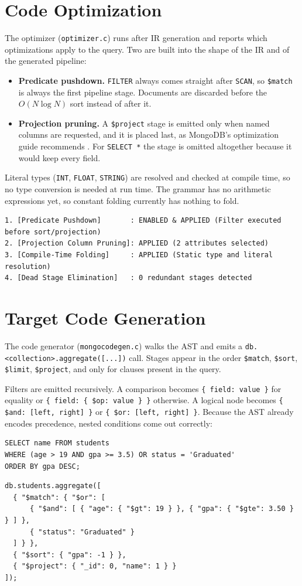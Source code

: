 \documentclass[12pt,a4paper]{report}
\newcommand{\codeus}{\textunderscore\allowbreak}
\DeclareRobustCommand{\code}[1]{\texttt{\let\_\codeus #1}}
\begin{document}
\section{Code Optimization}
The optimizer (\code{optimizer.c}) runs after IR generation and reports which optimizations apply to the query. Two are built into the shape of the IR and of the generated pipeline:
\begin{itemize}
  \item \textbf{Predicate pushdown.} \code{FILTER} always comes straight after \code{SCAN}, so \code{\$match} is always the first pipeline stage. Documents are discarded before the $O(N \log N)$ sort instead of after it.
  \item \textbf{Projection pruning.} A \code{\$project} stage is emitted only when named columns are requested, and it is placed last, as MongoDB's optimization guide recommends \cite{mongo-opt}. For \code{SELECT *} the stage is omitted altogether because it would keep every field.
\end{itemize}
Literal types (\code{INT}, \code{FLOAT}, \code{STRING}) are resolved and checked at compile time, so no type conversion is needed at run time. The grammar has no arithmetic expressions yet, so constant folding currently has nothing to fold.
\begin{Verbatim}[fontsize=\scriptsize]
1. [Predicate Pushdown]       : ENABLED & APPLIED (Filter executed before sort/projection)
2. [Projection Column Pruning]: APPLIED (2 attributes selected)
3. [Compile-Time Folding]     : APPLIED (Static type and literal resolution)
4. [Dead Stage Elimination]   : 0 redundant stages detected
\end{Verbatim}

\section{Target Code Generation}
The code generator (\code{mongo\_codegen.c}) walks the AST and emits a \code{db.<collection>.\allowbreak aggregate([...])} call. Stages appear in the order \code{\$match}, \code{\$sort}, \code{\$limit}, \code{\$project}, and only for clauses present in the query.

Filters are emitted recursively. A comparison becomes \code{\{ field: value \}} for equality or \code{\{ field: \{ \$op: value \} \}} otherwise. A logical node becomes \code{\{ \$and: [left, right] \}} or \code{\{ \$or: [left, right] \}}. Because the AST already encodes precedence, nested conditions come out correctly:
\begin{lstlisting}
SELECT name FROM students
WHERE (age > 19 AND gpa >= 3.5) OR status = 'Graduated'
ORDER BY gpa DESC;
\end{lstlisting}
\begin{lstlisting}
db.students.aggregate([
  { "$match": { "$or": [
      { "$and": [ { "age": { "$gt": 19 } }, { "gpa": { "$gte": 3.50 } } ] },
      { "status": "Graduated" }
  ] } },
  { "$sort": { "gpa": -1 } },
  { "$project": { "_id": 0, "name": 1 } }
]);
\end{lstlisting}
\end{document}

